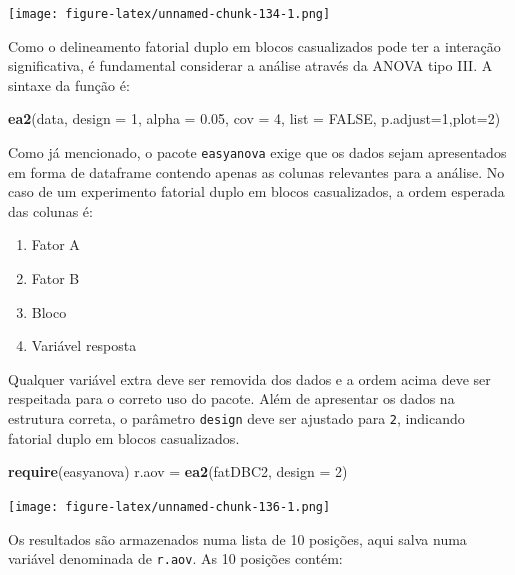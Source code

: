 \documentclass[
]{article}
\newenvironment{Shaded}{\begin{snugshade}}{\end{snugshade}}
\newcommand{\DataTypeTok}[1]{\textcolor[rgb]{0.13,0.29,0.53}{#1}}
\newcommand{\DecValTok}[1]{\textcolor[rgb]{0.00,0.00,0.81}{#1}}
\newcommand{\FloatTok}[1]{\textcolor[rgb]{0.00,0.00,0.81}{#1}}
\newcommand{\KeywordTok}[1]{\textcolor[rgb]{0.13,0.29,0.53}{\textbf{#1}}}
\newcommand{\NormalTok}[1]{#1}
\newcommand{\OtherTok}[1]{\textcolor[rgb]{0.56,0.35,0.01}{#1}}
\newcommand{\StringTok}[1]{\textcolor[rgb]{0.31,0.60,0.02}{#1}}
\providecommand{\tightlist}{%
  \setlength{\itemsep}{0pt}\setlength{\parskip}{0pt}}
\begin{document}
\texttt{[image: figure-latex/unnamed-chunk-134-1.png]}

Como o delineamento fatorial duplo em blocos casualizados pode ter a interação significativa, é fundamental considerar a análise através da ANOVA tipo III. A sintaxe da função é:

\begin{Shaded}
\begin{Highlighting}[]
\KeywordTok{ea2}\NormalTok{(data, }\DataTypeTok{design =} \DecValTok{1}\NormalTok{, }\DataTypeTok{alpha =} \FloatTok{0.05}\NormalTok{, }\DataTypeTok{cov =} \DecValTok{4}\NormalTok{, }\DataTypeTok{list =} \OtherTok{FALSE}\NormalTok{, }
    \DataTypeTok{p.adjust=}\DecValTok{1}\NormalTok{,}\DataTypeTok{plot=}\DecValTok{2}\NormalTok{)}
\end{Highlighting}
\end{Shaded}

Como já mencionado, o pacote \texttt{easyanova} exige que os dados sejam apresentados em forma de dataframe contendo apenas as colunas relevantes para a análise. No caso de um experimento fatorial duplo em blocos casualizados, a ordem esperada das colunas é:

\begin{enumerate}
\def\labelenumi{\arabic{enumi}.}
\tightlist
\item
  Fator A
\item
  Fator B
\item
  Bloco
\item
  Variável resposta
\end{enumerate}

Qualquer variável extra deve ser removida dos dados e a ordem acima deve ser respeitada para o correto uso do pacote. Além de apresentar os dados na estrutura correta, o parâmetro \texttt{design} deve ser ajustado para \texttt{2}, indicando fatorial duplo em blocos casualizados.

\begin{Shaded}
\begin{Highlighting}[]
\KeywordTok{require}\NormalTok{(easyanova)}
\NormalTok{r.aov =}\StringTok{ }\KeywordTok{ea2}\NormalTok{(fatDBC2, }\DataTypeTok{design =} \DecValTok{2}\NormalTok{)}
\end{Highlighting}
\end{Shaded}

\texttt{[image: figure-latex/unnamed-chunk-136-1.png]}

Os resultados são armazenados numa lista de 10 posições, aqui salva numa variável denominada de \texttt{r.aov}. As 10 posições contém:
\end{document}
